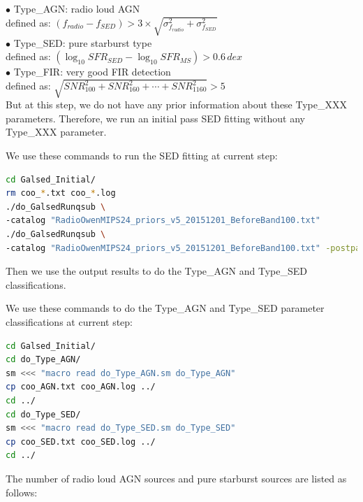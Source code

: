 \documentclass[11pt,a4paper]{article}
\begin{document}
\indent\hspace{15pt}$\bullet$ 
Type\_AGN: radio loud AGN
\\[5pt]
\indent\hspace{45pt}
defined as: $(f_{radio}-f_{SED}) > 3\times\sqrt{\sigma_{f_{radio}}^2+\sigma_{f_{SED}}^2}$
\\[5pt]
\indent\hspace{15pt}$\bullet$ 
Type\_SED: pure starburst type
\\[5pt]
\indent\hspace{45pt}
defined as: $\left( \log_{10}{SFR_{SED}} -\log_{10}{{SFR}_{MS}} \right) > 0.6 \,dex$
\\[5pt]
\indent\hspace{15pt}$\bullet$ 
Type\_FIR: very good FIR detection
\\[5pt]
\indent\hspace{45pt}
defined as: $\sqrt{SNR_{100}^2+SNR_{160}^2+\cdots+SNR_{1160}^2}>5$
\\

But at this step, we do not have any prior information about these Type\_XXX parameters. 
Therefore, we run an initial pass SED fitting without any Type\_XXX parameter. 

We use these commands to run the SED fitting at current step:

\begin{lstlisting}[language=bash]
cd Galsed_Initial/
rm coo_*.txt coo_*.log
./do_GalsedRunqsub \
-catalog "RadioOwenMIPS24_priors_v5_20151201_BeforeBand100.txt"
./do_GalsedRunqsub \
-catalog "RadioOwenMIPS24_priors_v5_20151201_BeforeBand100.txt" -postparallel
\end{lstlisting}

Then we use the output results to do the Type\_AGN and Type\_SED classifications. 

We use these commands to do the Type\_AGN and Type\_SED parameter classifications at current step:

\begin{lstlisting}[language=bash]
cd Galsed_Initial/
cd do_Type_AGN/
sm <<< "macro read do_Type_AGN.sm do_Type_AGN"
cp coo_AGN.txt coo_AGN.log ../
cd ../
cd do_Type_SED/
sm <<< "macro read do_Type_SED.sm do_Type_SED"
cp coo_SED.txt coo_SED.log ../
cd ../
\end{lstlisting}

The number of radio loud AGN sources and pure starburst sources are listed as follows:
\end{document}
